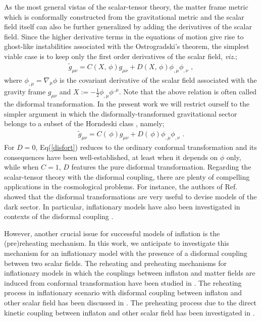 \documentclass[aps,prd,amsmath,amssymb,preprintnumbers,onecolumn,11pt,nofootinbib]{revtex4}
\begin{document}
As the most general vistas of the scalar-tensor theory, the matter frame metric which is conformally constructed from the gravitational metric and the scalar field itself can also be further generalized by adding the derivatives of the scalar field. Since the higher derivative terms in the equations of motion give rise to ghost-like instabilities associated with the Ostrogradski's theorem, the simplest viable case is to keep only the first order derivatives of the scalar field, {\it viz}.;
\begin{eqnarray} \label{disfor}
{\tilde g}_{\mu\nu} = C(X,\,\phi)g_{\mu\nu} + D(X,\,\phi)\phi_{,\mu}\phi_{,\nu}\,\,,
\end{eqnarray}
where $\phi_{,\mu} =\nabla_{\mu}\phi$ is the covariant derivative of the scalar field associated with the gravity frame $g_{\mu\nu}$ and $X:= -\frac{1}{2}\phi_{,\mu}\phi^{,\mu}$. Note that the above relation is often called the disformal transformation. In the present work we will restrict ourself to the simpler argument in which the disformally-transformed gravitational sector belongs to a subset of the Horndeski class \cite{Horndeski:1974wa,Bettoni:2013diz}, namely;
\begin{eqnarray} \label{disfort}
{\tilde g}_{\mu\nu} = C(\,\phi)g_{\mu\nu} + D(\,\phi)\phi_{,\mu}\phi_{,\nu}\,\,.
\end{eqnarray}
For $D=0$, Eq(\ref{disfort}) reduces to the ordinary conformal transformation and its consequences have been well-established, at least when it depends on $\phi$ only, while when $C=1$, $D$ features the pure disformal transformation. Regarding the scalar-tensor theory with the disformal coupling, there are plenty of compelling applications in the cosmological problems. For instance, the authors of Ref.\cite{Koivisto:2008ak,Zumalacarregui:2010wj,vandeBruck:2015ida} showed that the disformal transformations are very useful to devise models of the dark sector. In particular, inflationary models have also been investigated in contexts of the disformal coupling \cite{Kaloper:2003yf,vandeBruck:2015tna}.

However, another crucial issue for successful models of inflation is the (pre)reheating mechanism. In this work, we anticipate to investigate this mechanism for an inflationary model with the presence of a disformal coupling between two scalar fields.
The reheating and preheating mechanisms for inflationary models in which the couplings between inflaton and matter fields are induced from conformal transformation have been studied in \cite{conformal1, GarciaBellido:2008ab}.
The reheating process in inflationary scenario with disformal coupling between inflaton and other scalar field has been discussed in \cite{Kaloper:2003yf}.
The preheating process due to the direct kinetic coupling between inflaton and other scalar field has been investigated in \cite{ArmendarizPicon:2007iv,Myung:2016eut}.
\end{document}
